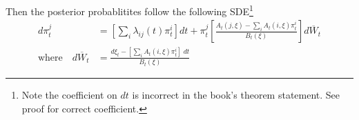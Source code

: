 \documentclass[12pt]{article}
\theoremstyle{plain}
\theoremstyle{definition}
\theoremstyle{remark}
\begin{document}
Then the posterior probablitites follow the following SDE\footnote{%
  Note the coefficient on $dt$ is incorrect in the book's theorem
  statement. See proof for correct coefficient.
}
\begin{align*}
  d\pi_t^j
  &=
  \left[
  \sum_i
  \lambda_{ij}(t)
  \pi^i_t
  \right]
  dt
  +
  \pi^j_t
  \left[
  \frac{A_t(j,\xi)-\sum_i A_t(i,\xi)\pi^i_t}{B_t(\xi)}
  \right]
  d\overline{W}_t
  \\
  \text{where}\quad
  d\overline{W}_t
  &=
  \frac{d\xi_t-\left[\sum_i A_t(i,\xi)\pi^i_t\right]\;dt}{B_t(\xi)}
\end{align*}
\end{document}
